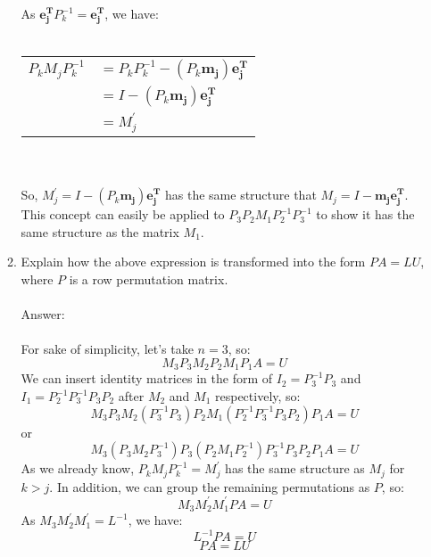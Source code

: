 \documentclass{article}
\renewcommand{\vec}[1]{\mathbf{#1}}
\begin{document}
\begin{enumerate}
\begin{enumerate}
  As $\vec{e_j^T}P_k^{-1}=\vec{e_j^T}$, we have:\\
\\
\begin{tabular}{rl}
$P_kM_jP_k^{-1}$ & $= P_kP_k^{-1}-(P_k\vec{m_j})\vec{e_j^T}$ \\
 & $= I-(P_k\vec{m_j})\vec{e_j^T}$ \\
 & $= M_j^\prime$ \\
\end{tabular}
\\
\\
So, $M_j^\prime=I-(P_k\vec{m_j})\vec{e_j^T}$ has the same structure that $M_j=I-\vec{m_j}\vec{e_j^T}$. This concept can easily be applied to $P_3 P_2 M_1 P_2^{-1} P_3^{-1}$ to show it has the same structure as the matrix $M_1$.
 
  \item Explain how the above expression is transformed into the form $PA = LU$, where $P$ is a row permutation matrix.\\
  \\
  Answer:\\
  \\
  For sake of simplicity, let's take $n=3$, so:
  $$M_3 P_3 M_2 P_2 M_1 P_1 A = U$$
  We can insert identity matrices in the form of $I_2=P_3^{-1}P_3$ and $I_1=P_2^{-1}P_3^{-1}P_3P_2$ after $M_2$ and $M_1$ respectively, so:
  $$M_3 P_3 M_2 (P_3^{-1} P_3) P_2 M_1 (P_2^{-1} P_3^{-1} P_3 P_2) P_1 A = U$$
  or
  $$M_3 (P_3 M_2 P_3^{-1}) P_3 (P_2 M_1 P_2^{-1}) P_3^{-1} P_3 P_2 P_1 A = U$$
  As we already know, $P_kM_jP_k^{-1}=M_j^\prime$ has the same structure as $M_j$ for $k>j$. In addition, we can group the remaining permutations as $P$, so:
  $$M_3 M_2^\prime M_1^\prime P A = U$$
  As $M_3 M_2^\prime M_1^\prime = L^{-1}$, we have:
  $$L^{-1} P A = U$$
  $$P A = L U$$
  \end{enumerate}
\end{enumerate}
\end{document}
